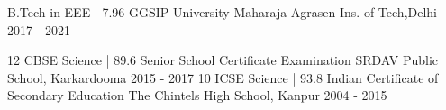 

\begin{cventries}

  \cventry
    {B.Tech in EEE | 7.96} %
    {GGSIP University} %
    {Maharaja Agrasen Ins. of Tech,Delhi} %
    {2017 - 2021} %
    {
    }
\vspace{-0.5cm}

  \cventry
    {12 CBSE Science | 89.6} %
    {Senior School Certificate Examination}%
    {SRDAV Public School, Karkardooma} %
    {2015 - 2017} %
    {
    }
\vspace{-0.4 cm}
  \cventry
    {10 ICSE Science | 93.8} %
    {Indian Certificate of Secondary Education}%
    {The Chintels High School, Kanpur} %
    {2004 - 2015} %
    {
    }
\vspace{-0.7cm}
\end{cventries}
